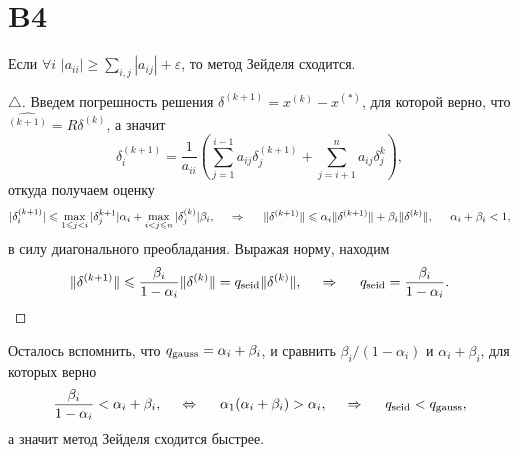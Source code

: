 \newpage

\section{B4}

\begin{to_thr}[]
    Если $\forall i$  $|a_{ii}| \geq \sum_{i,j} |a_{ij}| +\varepsilon$, то метод Зейделя сходится.
\end{to_thr}

\begin{proof}[$\triangle$]
    Введем погрешность решения $\delta^{(k+1)} = x^{(k)}-x^{(*)}$, для которой верно, что $\hat{^(k+1)} = R \delta^{(k)}$, а значит
    \begin{equation*}
        \delta_i^{(k+1)} = \frac{1}{a_{ii}}\left(
            \sum_{j=1}^{i-1} a_{ij} \delta_j^{(k+1)} + \sum_{j=i+1}^{n} a_{ij} \delta_j^{k}
        \right),
    \end{equation*}
    откуда получаем оценку
    \begin{equation*}
        |\delta_i^{(k+1)}| \leq \max_{1 \leq j < i} |\delta_j^{k+1}| \alpha_i  + \max_{i < j \leq n} |\delta_j^{(k)}| \beta_i,
        \hspace{0.5cm} \Rightarrow \hspace{0.5cm}
        \|\delta^{(k+1)}\| \leq 
         \alpha_i \|\delta^{(k+1)}\| + \beta_i \|\delta^{(k)}\|,
         \hspace{5 mm} 
         \alpha_i+ \beta_i < 1,
    \end{equation*}
    в силу диагонального преобладания. 
    Выражая норму, находим
    \begin{equation*}
        \|\delta^{(k+1)}\| \leq \frac{\beta_i}{1-\alpha_i} \|\delta^{(k)}\| = \sub{q}{seid}\|\delta^{(k)}\|,
        \hspace{0.5cm} \Rightarrow \hspace{0.5cm}
        \sub{q}{seid} = \frac{\beta_i}{1-\alpha_i}.
    \end{equation*}
\end{proof}

    Осталось вспомнить, что $\sub{q}{gauss} = \alpha_i + \beta_i$, и сравнить $\beta_i/(1-\alpha_i)$  и $\alpha_i + \beta_i$, для которых верно
    \begin{equation*}
        \frac{\beta_i}{1-\alpha_i} < \alpha_i + \beta_i,
        \hspace{0.5cm} \Leftrightarrow \hspace{0.5cm}
        \alpha_1 (\alpha_i + \beta_i) > \alpha_i,
        \hspace{0.5cm} \Rightarrow \hspace{0.5cm}
        \sub{q}{seid} < \sub{q}{gauss},
    \end{equation*}
    а значит метод Зейделя сходится быстрее.